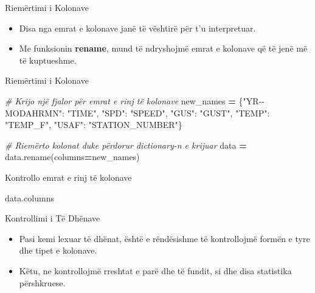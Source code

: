 \documentclass[
  ignorenonframetext,
]{beamer}
\newenvironment{Shaded}{\begin{snugshade}}{\end{snugshade}}
\newcommand{\CommentTok}[1]{\textcolor[rgb]{0.56,0.35,0.01}{\textit{#1}}}
\newcommand{\NormalTok}[1]{#1}
\newcommand{\OperatorTok}[1]{\textcolor[rgb]{0.81,0.36,0.00}{\textbf{#1}}}
\newcommand{\StringTok}[1]{\textcolor[rgb]{0.31,0.60,0.02}{#1}}
\begin{document}
\begin{frame}{Riemërtimi i Kolonave}
\protect\hypertarget{riemuxebrtimi-i-kolonave}{}
\begin{itemize}
\item
  Disa nga emrat e kolonave janë të vështirë për t'u interpretuar.
\item
  Me funksionin \textbf{rename}, mund të ndryshojmë emrat e kolonave që
  të jenë më të kuptueshme.
\end{itemize}
\end{frame}

\begin{frame}[fragile]{Riemërtimi i Kolonave}
\protect\hypertarget{riemuxebrtimi-i-kolonave-1}{}
\begin{Shaded}
\begin{Highlighting}[]
\CommentTok{\# Krijo një fjalor për emrat e rinj të kolonave}
\NormalTok{new\_names }\OperatorTok{=}\NormalTok{ \{}\StringTok{"YR{-}{-}MODAHRMN"}\NormalTok{: }\StringTok{"TIME"}\NormalTok{, }\StringTok{"SPD"}\NormalTok{: }\StringTok{"SPEED"}\NormalTok{, }\StringTok{"GUS"}\NormalTok{: }\StringTok{"GUST"}\NormalTok{, }\StringTok{"TEMP"}\NormalTok{: }\StringTok{"TEMP\_F"}\NormalTok{, }\StringTok{"USAF"}\NormalTok{: }\StringTok{"STATION\_NUMBER"}\NormalTok{\}}

\CommentTok{\# Riemërto kolonat duke përdorur dictionary{-}n e krijuar}
\NormalTok{data }\OperatorTok{=}\NormalTok{ data.rename(columns}\OperatorTok{=}\NormalTok{new\_names)}
\end{Highlighting}
\end{Shaded}
\end{frame}

\begin{frame}[fragile]{Kontrollo emrat e rinj të kolonave}
\protect\hypertarget{kontrollo-emrat-e-rinj-tuxeb-kolonave}{}
\begin{Shaded}
\begin{Highlighting}[]
\NormalTok{data.columns}
\end{Highlighting}
\end{Shaded}
\end{frame}

\begin{frame}{Kontrollimi i Të Dhënave}
\protect\hypertarget{kontrollimi-i-tuxeb-dhuxebnave}{}
\begin{itemize}
\item
  Pasi kemi lexuar të dhënat, është e rëndësishme të kontrollojmë formën
  e tyre dhe tipet e kolonave.
\item
  Këtu, ne kontrollojmë rreshtat e parë dhe të fundit, si dhe disa
  statistika përshkruese.
\end{itemize}
\end{frame}
\end{document}
